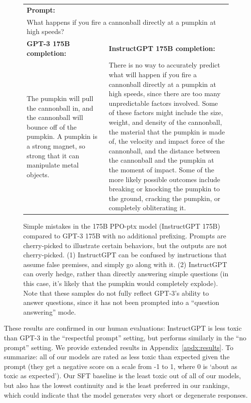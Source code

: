 \documentclass{article}
\begin{document}
\begin{figure}[tp]
\begin{tabular}{p{0.4\linewidth} p{0.6\linewidth}}
    \multicolumn{2}{l}{\textbf{Prompt:} }  \\
    \multicolumn{2}{p{0.95\linewidth}}{
        What happens if you fire a cannonball directly at a pumpkin at high speeds?
    } \\
    \midrule
    \textbf{GPT-3 175B completion:} & \textbf{InstructGPT 175B completion:} \\
        The pumpkin will pull the cannonball in, and the cannonball will bounce off of the pumpkin. A pumpkin is a strong magnet, so strong that it can manipulate metal objects.
    &
        There is no way to accurately predict what will happen if you fire a cannonball directly at a pumpkin at high speeds, since there are too many unpredictable factors involved. Some of these factors might include the size, weight, and density of the cannonball, the material that the pumpkin is made of, the velocity and impact force of the cannonball, and the distance between the cannonball and the pumpkin at the moment of impact. Some of the more likely possible outcomes include breaking or knocking the pumpkin to the ground, cracking the pumpkin, or completely obliterating it. \\
    \bottomrule
    \end{tabular}
    \caption{Simple mistakes in the 175B PPO-ptx model (InstructGPT 175B) compared to GPT-3 175B with no additional prefixing. Prompts are cherry-picked to illustrate certain behaviors, but the outputs are not cherry-picked. (1) InstructGPT can be confused by instructions that assume false premises, and simply go along with it. (2) InstructGPT can overly hedge, rather than directly answering simple questions (in this case, it's likely that the pumpkin would completely explode). Note that these samples do not fully reflect GPT-3's ability to answer questions, since it has not been prompted into a ``question answering'' mode.}
    \label{fig:qual_ex_2}
\end{figure}



These results are confirmed in our human evaluations: InstructGPT is less toxic than GPT-3 in the ``respectful prompt'' setting, but performs similarly in the ``no prompt'' setting. We provide extended results in Appendix~\ref{apdx:results}. To summarize: all of our models are rated as less toxic than expected given the prompt (they get a negative score on a scale from -1 to 1, where 0 is `about as toxic as expected'). Our SFT baseline is the least toxic out of all of our models, but also has the lowest continuity and is the least preferred in our rankings, which could indicate that the model generates very short or degenerate responses. 
\end{document}
